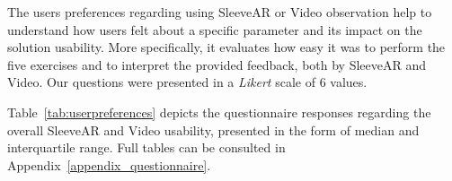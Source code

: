 \begin{table}[!t]
\centering
{}
\caption{Questionnaire results}
\label{tab:userpreferences}
\end{table}


The users preferences regarding using SleeveAR or Video observation help to understand how users felt about a specific parameter and its impact on the solution usability. 
More specifically, it evaluates how easy it was to perform the five exercises and to interpret the provided feedback, both by SleeveAR and Video.
Our questions were presented in a \textit{Likert} scale of 6 values.

Table~\ref{tab:userpreferences} depicts the questionnaire responses regarding the overall SleeveAR and Video usability, presented in the form of median and interquartile range. Full tables can be consulted in Appendix~\ref{appendix_questionnaire}.

